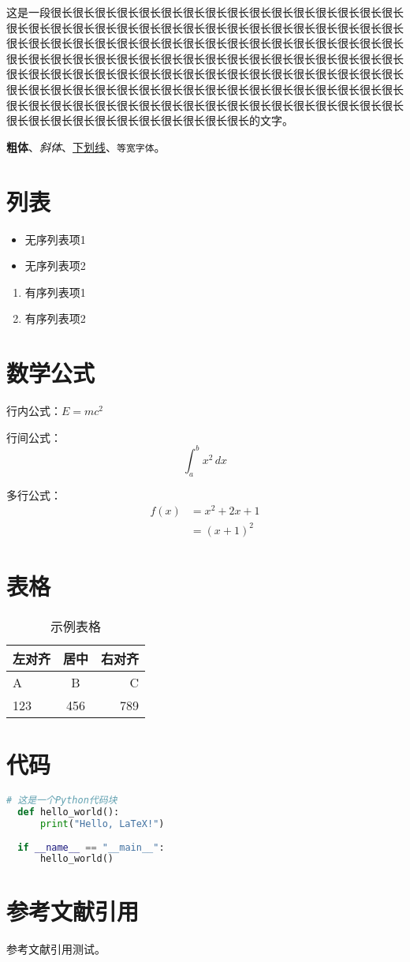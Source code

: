 这是一段很长很长很长很长很长很长很长很长很长很长很长很长很长很长很长很长很长很长很长很长很长很长很长很长很长很长很长很长很长很长很长很长很长很长很长很长很长很长很长很长很长很长很长很长很长很长很长很长很长很长很长很长很长很长很长很长很长很长很长很长很长很长很长很长很长很长很长很长很长很长很长很长很长很长很长很长很长很长很长很长很长很长很长很长很长很长很长很长很长很长很长很长很长很长很长很长很长很长很长很长很长很长很长很长很长很长很长很长很长很长很长很长很长很长很长很长很长很长很长很长很长很长很长很长很长很长很长很长很长很长很长很长很长很长很长的文字。

\textbf{粗体}、\textit{斜体}、\underline{下划线}、\texttt{等宽字体}。

\section{列表}
\begin{itemize}
    \item 无序列表项1
    \item 无序列表项2
\end{itemize}

\begin{enumerate}
    \item 有序列表项1
    \item 有序列表项2
\end{enumerate}

\section{数学公式}
行内公式：$E=mc^2$

行间公式：
\[ \int_{a}^{b} x^2 \,dx \]

多行公式：
\begin{align}
    f(x) &= x^2 + 2x + 1 \\
         &= (x + 1)^2
\end{align}

\section{表格}
\begin{table}[h]
\centering
\caption{示例表格}
\begin{tabular}{lcr}
\toprule
左对齐 & 居中 & 右对齐 \\
\midrule
A & B & C \\
123 & 456 & 789 \\
\bottomrule
\end{tabular}
\label{tab:example}
\end{table}

\section{代码}
\begin{lstlisting}[language=Python]
  # 这是一个Python代码块
  def hello_world():
      print("Hello, LaTeX!")
  
  if __name__ == "__main__":
      hello_world()
\end{lstlisting}

\section{参考文献引用}

参考文献引用测试\cite{xu2025, Wangyan2024, wu2023enhance}。